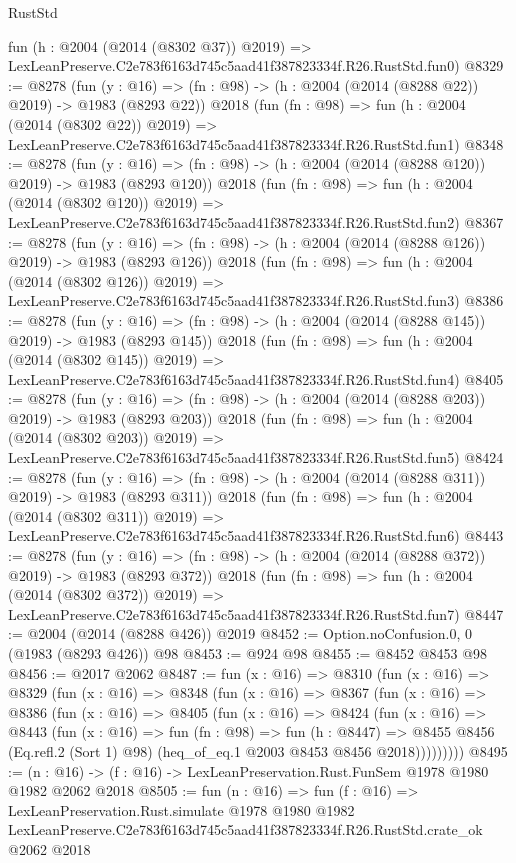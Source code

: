 \begin{lexlean}{RustStd}
\begin{coremodule}
    fun (h : @2004 (@2014 (@8302 @37)) @2019) =>
    LexLeanPreserve.C2e783f6163d745c5aad41f387823334f.R26.RustStd.fun0)
@8329 := @8278
    (fun (y : @16) => (fn : @98) -> (h : @2004 (@2014 (@8288 @22)) @2019) -> @1983 (@8293 @22))
    @2018
    (fun (fn : @98) =>
    fun (h : @2004 (@2014 (@8302 @22)) @2019) =>
    LexLeanPreserve.C2e783f6163d745c5aad41f387823334f.R26.RustStd.fun1)
@8348 := @8278
    (fun (y : @16) => (fn : @98) -> (h : @2004 (@2014 (@8288 @120)) @2019) -> @1983 (@8293 @120))
    @2018
    (fun (fn : @98) =>
    fun (h : @2004 (@2014 (@8302 @120)) @2019) =>
    LexLeanPreserve.C2e783f6163d745c5aad41f387823334f.R26.RustStd.fun2)
@8367 := @8278
    (fun (y : @16) => (fn : @98) -> (h : @2004 (@2014 (@8288 @126)) @2019) -> @1983 (@8293 @126))
    @2018
    (fun (fn : @98) =>
    fun (h : @2004 (@2014 (@8302 @126)) @2019) =>
    LexLeanPreserve.C2e783f6163d745c5aad41f387823334f.R26.RustStd.fun3)
@8386 := @8278
    (fun (y : @16) => (fn : @98) -> (h : @2004 (@2014 (@8288 @145)) @2019) -> @1983 (@8293 @145))
    @2018
    (fun (fn : @98) =>
    fun (h : @2004 (@2014 (@8302 @145)) @2019) =>
    LexLeanPreserve.C2e783f6163d745c5aad41f387823334f.R26.RustStd.fun4)
@8405 := @8278
    (fun (y : @16) => (fn : @98) -> (h : @2004 (@2014 (@8288 @203)) @2019) -> @1983 (@8293 @203))
    @2018
    (fun (fn : @98) =>
    fun (h : @2004 (@2014 (@8302 @203)) @2019) =>
    LexLeanPreserve.C2e783f6163d745c5aad41f387823334f.R26.RustStd.fun5)
@8424 := @8278
    (fun (y : @16) => (fn : @98) -> (h : @2004 (@2014 (@8288 @311)) @2019) -> @1983 (@8293 @311))
    @2018
    (fun (fn : @98) =>
    fun (h : @2004 (@2014 (@8302 @311)) @2019) =>
    LexLeanPreserve.C2e783f6163d745c5aad41f387823334f.R26.RustStd.fun6)
@8443 := @8278
    (fun (y : @16) => (fn : @98) -> (h : @2004 (@2014 (@8288 @372)) @2019) -> @1983 (@8293 @372))
    @2018
    (fun (fn : @98) =>
    fun (h : @2004 (@2014 (@8302 @372)) @2019) =>
    LexLeanPreserve.C2e783f6163d745c5aad41f387823334f.R26.RustStd.fun7)
@8447 := @2004 (@2014 (@8288 @426)) @2019
@8452 := Option.noConfusion.{0, 0} (@1983 (@8293 @426)) @98
@8453 := @924 @98
@8455 := @8452 @8453 @98
@8456 := @2017 @2062
@8487 := fun (x : @16) =>
  @8310
    (fun (x : @16) =>
    @8329
      (fun (x : @16) =>
      @8348
        (fun (x : @16) =>
        @8367
          (fun (x : @16) =>
          @8386
            (fun (x : @16) =>
            @8405
              (fun (x : @16) =>
              @8424
                (fun (x : @16) =>
                @8443
                  (fun (x : @16) =>
                  fun (fn : @98) =>
                  fun (h : @8447) =>
                  @8455
                    @8456
                    (Eq.refl.{2} (Sort 1) @98)
                    (heq_of_eq.{1} @2003 @8453 @8456 @2018)))))))))
@8495 := (n : @16) -> (f : @16) -> LexLeanPreservation.Rust.FunSem @1978 @1980 @1982 @2062 @2018
@8505 := fun (n : @16) =>
  fun (f : @16) =>
  LexLeanPreservation.Rust.simulate
    @1978
    @1980
    @1982
    LexLeanPreserve.C2e783f6163d745c5aad41f387823334f.R26.RustStd.crate_ok
    @2062
    @2018
\end{coremodule}
\end{lexlean}

